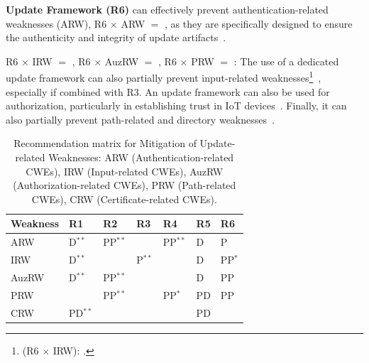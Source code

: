 \documentclass[fleqn,s1,names,tex]{neptune}
\begin{document}
\cvpt\textbf{Update Framework (R6)}
can effectively prevent authentication-related weaknesses (ARW),
R6 $\times$ ARW $=$ , as they are
specifically designed to ensure the authenticity and integrity of update
artifacts~\citep{10.1145/3678890.3678927}.

 R6 $\times$ IRW $=$ ,
R6 $\times$ AuzRW $=$ ,
R6 $\times$ PRW $=$ :
The use of a dedicated update framework can also partially prevent
input-related
weaknesses\footnote{(R6 $\times$ IRW): .}~\citep{10.1145/3678890.3678927},
especially if combined with R3.  
An update framework can also be used for authorization, particularly in
establishing trust in IoT devices~\citep{10633309}.
Finally, it can also partially prevent path-related and directory
weaknesses~\citep{10.1145/3678890.3678927}.

\begin{table}[hline,belowfloat=20pt]
\caption{Recommendation matrix for Mitigation of Update-related Weaknesses:  
ARW (Authentication-related CWEs),
IRW (Input-related  CWEs),  
AuzRW (Authorization-related  CWEs),
PRW (Path-related CWEs),  
CRW  (Certificate-related CWEs).}
\bstmfloatsrc
\begin{fsrc}
\tblfont
\begin{tabular*}{195pt}{l|l|l|l|l|l|l}
\toprule
\textbf{Weakness}& \textbf{R1} &  \textbf{R2} &  \textbf{R3} &  \textbf{R4} &  \textbf{R5}&  \textbf{R6}\\ \midrule

ARW & D$^{**}$ \cellcolor{yellow!50} &PP$^{**}$ \cellcolor{green!50} &  & PP$^{**}$ \cellcolor{green!50} &  D \cellcolor{yellow!50}  &   P \cellcolor{green!50} \\  \hline
IRW & D$^{**}$ \cellcolor{yellow!50} & & P$^{**}$ \cellcolor{green!50} &  &    D \cellcolor{yellow!50} &  PP$^{*}$ \cellcolor{green!50}\\ \hline
AuzRW   & D$^{**}$ \cellcolor{yellow!50} & PP$^{**}$ \cellcolor{green!50} &   &   & D \cellcolor{yellow!50}  &    PP \cellcolor{green!50} \\  \hline
PRW   && PP$^{**}$ \cellcolor{green!50} &  & PP$^*$ \cellcolor{green!50} &  PD \cellcolor{yellow!50}& PP \cellcolor{green!50}    \\  \hline
CRW & PD$^{**}$ \cellcolor{yellow!50} & && &    PD \cellcolor{yellow!50} & \\ 
\bottomrule
\end{tabular*}
\end{fsrc}
\estmfloatsrc

\end{table}
\end{document}
